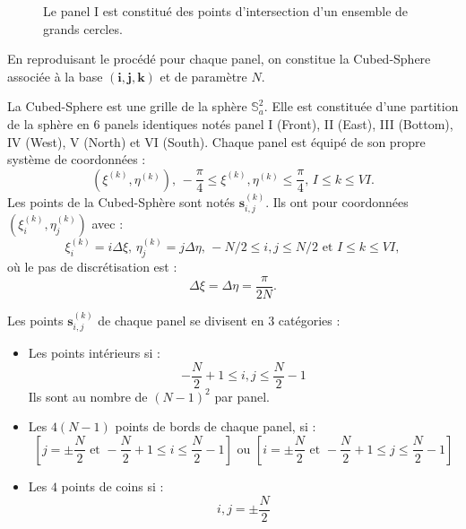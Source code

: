 \begin{figure}[htbp]
\begin{center}
\end{center}
\caption{Le panel I est constitué des points d'intersection d'un ensemble de grands cercles.}
\label{fig: panel I}
\end{figure}  

En reproduisant le procédé pour chaque panel, on constitue la Cubed-Sphere associée à la base $(\mathbf{i},\mathbf{j},\mathbf{k})$ et de paramètre $N$.

\begin{definition}
La Cubed-Sphere est une grille de la sphère $\mathbb{S}_a^2$. Elle est constituée d'une partition de la sphère en 6 panels identiques notés panel I (Front), II (East), III (Bottom), IV (West), V (North) et VI (South). Chaque panel est équipé de son propre système de coordonnées :
\begin{equation}
\left( \xi^{(k)}, \eta^{(k)} \right) \text{, } -\dfrac{\pi}{4} \leq \xi^{(k)}, \eta^{(k)} \leq \dfrac{\pi}{4} \text{, } I \leq k \leq VI.
\end{equation}
Les points de la Cubed-Sphère sont notés $\mathbf{s}_{i,j}^{(k)}$. Ils ont pour coordonnées $\left( \xi_i^{(k)}, \eta_j^{(k)}  \right)$ avec :
\begin{equation}
\xi_i^{(k)} = i \Delta \xi \text{, } \eta_j^{(k)} = j \Delta \eta \text{, } -N/2 \leq i, j \leq N/2 \text{ et } I \leq k \leq VI,
\end{equation}
où le pas de discrétisation est :
\begin{equation}
\Delta \xi = \Delta \eta = \dfrac{\pi}{2 N}.
\end{equation}
\end{definition}

Les points $\mathbf{s}_{i,j}^{(k)}$ de chaque panel se divisent en 3 catégories :
\begin{itemize}
\item Les points intérieurs si :
\begin{equation}
- \dfrac{N}{2}+1 \leq i,j \leq \dfrac{N}{2}-1
\end{equation}
Ils sont au nombre de $(N-1)^2$ par panel.
\item Les $4(N-1)$ points de bords de chaque panel, si :
\begin{equation}
\left[ j=\pm \dfrac{N}{2} \text{ et } - \dfrac{N}{2}+1 \leq i \leq \dfrac{N}{2}-1 \right] \text{ ou } \left[ i=\pm \dfrac{N}{2} \text{ et } - \dfrac{N}{2}+1 \leq j \leq \dfrac{N}{2}-1 \right]
\end{equation}
\item Les $4$ points de coins si :
\begin{equation}
i, j = \pm \dfrac{N}{2}
\end{equation}
\end{itemize}

